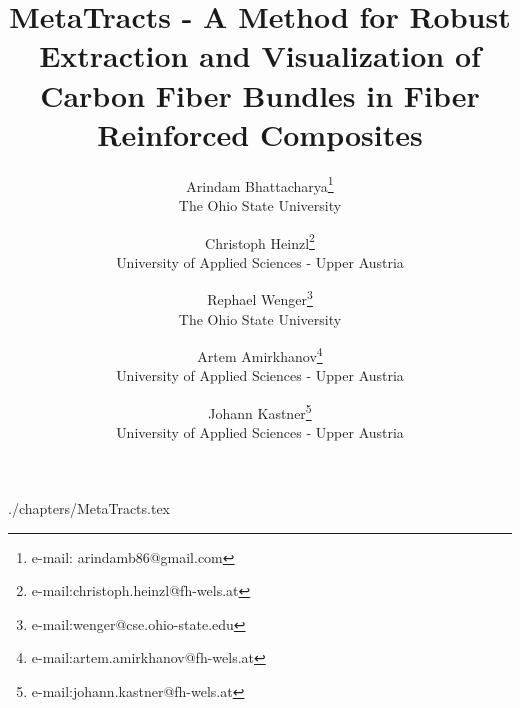 \documentclass{vgtc}                          %
\title{MetaTracts - A Method for Robust Extraction and Visualization of Carbon Fiber Bundles in Fiber Reinforced Composites}
\author{Arindam Bhattacharya\thanks{e-mail: arindamb86@gmail.com}\\ %
     \scriptsize The Ohio State University %
\and Christoph Heinzl\thanks{e-mail:christoph.heinzl@fh-wels.at}\\ %
     \scriptsize University of Applied Sciences - Upper Austria%
\and Rephael Wenger\thanks{e-mail:wenger@cse.ohio-state.edu}\\ %
\scriptsize The Ohio State University
\and Artem Amirkhanov\thanks{e-mail:artem.amirkhanov@fh-wels.at}\\ %
     \scriptsize University of Applied Sciences - Upper Austria%
\and Johann Kastner\thanks{e-mail:johann.kastner@fh-wels.at}\\ %
     \scriptsize University of Applied Sciences - Upper Austria%
	    }
\begin{document}


\maketitle

 {./chapters/MetaTracts.tex}



\end{document}
